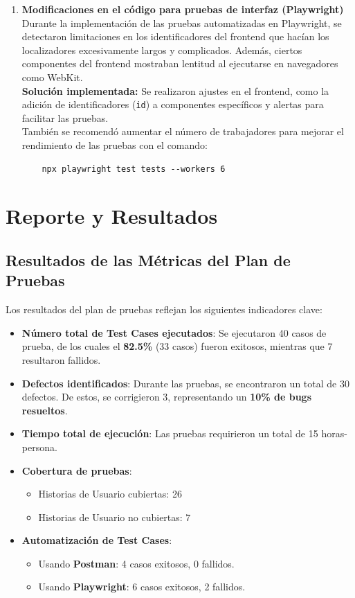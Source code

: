 \documentclass[stu, 12pt, letterpaper, donotrepeattitle, floatsintext, natbib]{apa7}
\begin{document}
\begin{enumerate}
    \item \textbf{Modificaciones en el código para pruebas de interfaz (Playwright)} \\
    Durante la implementación de las pruebas automatizadas en Playwright, se detectaron limitaciones en los identificadores del frontend que hacían los localizadores excesivamente largos y complicados. Además, ciertos componentes del frontend mostraban lentitud al ejecutarse en navegadores como WebKit. \\
    \textbf{Solución implementada:} Se realizaron ajustes en el frontend, como la adición de identificadores (\texttt{id}) a componentes específicos y alertas para facilitar las pruebas. \\
    También se recomendó aumentar el número de trabajadores para mejorar el rendimiento de las pruebas con el comando:
    \begin{verbatim}
    npx playwright test tests --workers 6
    \end{verbatim}
    
\end{enumerate}


\section{Reporte y Resultados}

\subsection{Resultados de las Métricas del Plan de Pruebas}

\noindent Los resultados del plan de pruebas reflejan los siguientes indicadores clave:  

\begin{itemize}
    \item \textbf{Número total de Test Cases ejecutados}: Se ejecutaron 40 casos de prueba, de los cuales el \textbf{82.5\%} (33 casos) fueron exitosos, mientras que 7 resultaron fallidos.
    \item \textbf{Defectos identificados}: Durante las pruebas, se encontraron un total de 30 defectos. De estos, se corrigieron 3, representando un \textbf{10\% de bugs resueltos}.
    \item \textbf{Tiempo total de ejecución}: Las pruebas requirieron un total de 15 horas-persona.
    \item \textbf{Cobertura de pruebas}: 
    \begin{itemize}
        \item Historias de Usuario cubiertas: 26  
        \item Historias de Usuario no cubiertas: 7
    \end{itemize}
    \item \textbf{Automatización de Test Cases}: 
    \begin{itemize}
        \item Usando \textbf{Postman}: 4 casos exitosos, 0 fallidos.
        \item Usando \textbf{Playwright}: 6 casos exitosos, 2 fallidos.
    \end{itemize}
\end{itemize}
\end{document}
